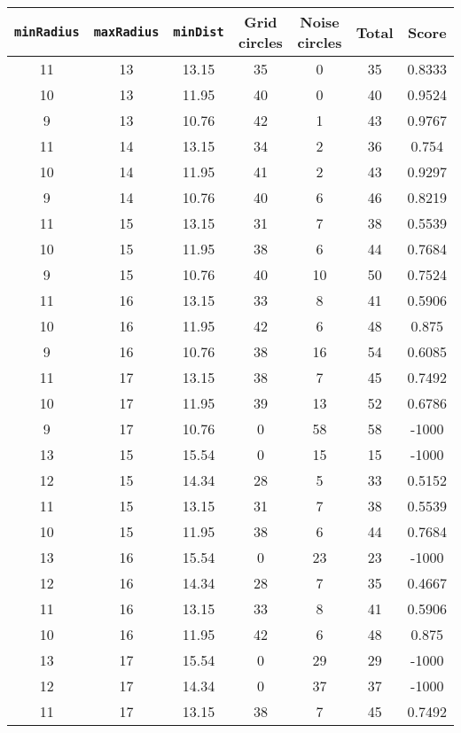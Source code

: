 \documentclass[letterpaper, 12pt]{article}
\begin{document}
\begin{longtable}{|c|c|c|c|c|c|c|}
\hline
\textbf{\texttt{minRadius}} & \textbf{\texttt{maxRadius}} & \textbf{\texttt{minDist}} & \textbf{Grid circles} & \textbf{Noise circles} & \textbf{Total} & \textbf{Score} \\
\hline
11 & 13 & 13.15 & 35 & 0 & 35 & 0.8333 \\
\hline
10 & 13 & 11.95 & 40 & 0 & 40 & 0.9524 \\
\hline
9 & 13 & 10.76 & 42 & 1 & 43 & 0.9767 \\
\hline
11 & 14 & 13.15 & 34 & 2 & 36 & 0.754 \\
\hline
10 & 14 & 11.95 & 41 & 2 & 43 & 0.9297 \\
\hline
9 & 14 & 10.76 & 40 & 6 & 46 & 0.8219 \\
\hline
11 & 15 & 13.15 & 31 & 7 & 38 & 0.5539 \\
\hline
10 & 15 & 11.95 & 38 & 6 & 44 & 0.7684 \\
\hline
9 & 15 & 10.76 & 40 & 10 & 50 & 0.7524 \\
\hline
11 & 16 & 13.15 & 33 & 8 & 41 & 0.5906 \\
\hline
10 & 16 & 11.95 & 42 & 6 & 48 & 0.875 \\
\hline
9 & 16 & 10.76 & 38 & 16 & 54 & 0.6085 \\
\hline
11 & 17 & 13.15 & 38 & 7 & 45 & 0.7492 \\
\hline
10 & 17 & 11.95 & 39 & 13 & 52 & 0.6786 \\
\hline
9 & 17 & 10.76 & 0 & 58 & 58 & -1000 \\
\hline
13 & 15 & 15.54 & 0 & 15 & 15 & -1000 \\
\hline
12 & 15 & 14.34 & 28 & 5 & 33 & 0.5152 \\
\hline
11 & 15 & 13.15 & 31 & 7 & 38 & 0.5539 \\
\hline
10 & 15 & 11.95 & 38 & 6 & 44 & 0.7684 \\
\hline
13 & 16 & 15.54 & 0 & 23 & 23 & -1000 \\
\hline
12 & 16 & 14.34 & 28 & 7 & 35 & 0.4667 \\
\hline
11 & 16 & 13.15 & 33 & 8 & 41 & 0.5906 \\
\hline
10 & 16 & 11.95 & 42 & 6 & 48 & 0.875 \\
\hline
13 & 17 & 15.54 & 0 & 29 & 29 & -1000 \\
\hline
12 & 17 & 14.34 & 0 & 37 & 37 & -1000 \\
\hline
11 & 17 & 13.15 & 38 & 7 & 45 & 0.7492 \\
\hline

\end{longtable}
\end{document}
